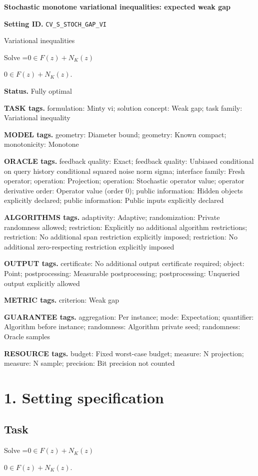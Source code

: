 \documentclass[10pt,a4paper]{article}
\newcommand{\AtlasMath}[1]{\par\begingroup\centering\setbox0=\hbox{$\displaystyle #1$}\ifdim\wd0>1.4\linewidth\typeout{ATLAS WIDE FORMULA: \the\wd0}\fi\ifdim\wd0>\linewidth\resizebox{\linewidth}{!}{\box0}\else\box0\fi\par\endgroup}
\newcommand{\AtlasInlineMath}[1]{\begingroup\setbox0=\hbox{$#1$}\ifdim\wd0>.4\linewidth\endgroup\AtlasMath{#1}\else\endgroup$#1$\fi}
\begin{document}
\raggedright

{\LARGE\bfseries\sffamily\color{AtlasNavy} Stochastic monotone variational inequalities: expected weak gap\par}\vspace{5pt}
\textbf{Setting ID.} \texttt{CV\_\allowbreak{}S\_\allowbreak{}STOCH\_\allowbreak{}GAP\_\allowbreak{}VI}

Variational inequalities

Solve \AtlasInlineMath{0\in F(z)+N_K(z)}.

\textbf{Status.} Fully optimal

\textbf{TASK tags.} formulation: Minty vi; solution concept: Weak gap; task family: Variational inequality

\textbf{MODEL tags.} geometry: Diameter bound; geometry: Known compact; monotonicity: Monotone

\textbf{ORACLE tags.} feedback quality: Exact; feedback quality: Unbiased conditional on query history conditional squared noise norm sigma; interface family: Fresh operator; operation: Projection; operation: Stochastic operator value; operator derivative order: Operator value (order 0); public information: Hidden objects explicitly declared; public information: Public inputs explicitly declared

\textbf{ALGORITHMS tags.} adaptivity: Adaptive; randomization: Private randomness allowed; restriction: Explicitly no additional algorithm restrictions; restriction: No additional span restriction explicitly imposed; restriction: No additional zero-respecting restriction explicitly imposed

\textbf{OUTPUT tags.} certificate: No additional output certificate required; object: Point; postprocessing: Measurable postprocessing; postprocessing: Unqueried output explicitly allowed

\textbf{METRIC tags.} criterion: Weak gap

\textbf{GUARANTEE tags.} aggregation: Per instance; mode: Expectation; quantifier: Algorithm before instance; randomness: Algorithm private seed; randomness: Oracle samples

\textbf{RESOURCE tags.} budget: Fixed worst-case budget; measure: N projection; measure: N sample; precision: Bit precision not counted

\section{1. Setting specification}
\subsection{Task}
Solve \AtlasInlineMath{0\in F(z)+N_K(z)}.
\end{document}
